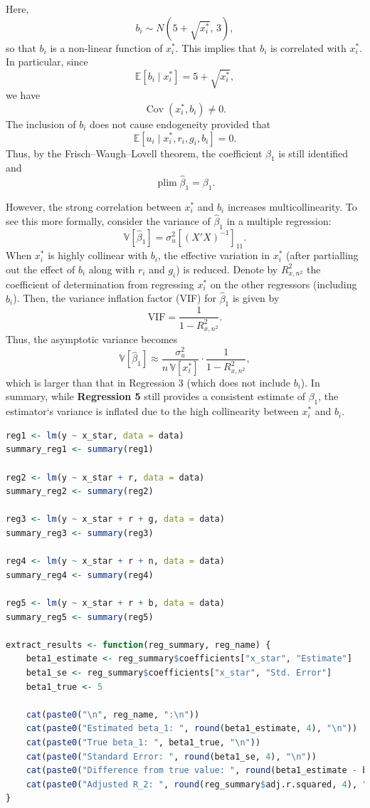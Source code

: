 \documentclass[a4paper,12pt]{article} %
\theoremstyle{nonitalic}
\newenvironment{solution}[1]
  {\renewcommand\theinnercustomsol{#1}\innercustomsol}
  {\endinnercustomsol}
\newcounter{solutionctr}
\renewcommand{\thesolutionctr}{(\alph{solutionctr})}
\newenvironment{autosolution}
  {\stepcounter{solutionctr}\begin{solution}{\thesolutionctr}}
  {\end{solution}}
\begin{document}
\begin{autosolution}
Here,
\[
b_i \sim N\left(5+\sqrt{x_i^*},\,3\right),
\]
so that $b_i$ is a non-linear function of $x_i^*$. 
This implies that $b_i$ is correlated with $x_i^*$. 
In particular, since
\[
\mathbb{E}[b_i\mid x_i^*] = 5 + \sqrt{x_i^*},
\]
we have
\[
\operatorname{Cov}(x_i^*, b_i) \neq 0.
\]
The inclusion of $b_i$ does not cause endogeneity provided that 
\[
\mathbb{E}[u_i \mid x_i^*, r_i, g_i, b_i] = 0.
\]
Thus, by the Frisch--Waugh--Lovell theorem, 
the coefficient $\beta_1$ is still identified and
\[
\operatorname*{plim}\hat{\beta}_1 = \beta_1.
\]

However, the strong correlation between $x_i^*$ and $b_i$ increases multicollinearity. 
To see this more formally, consider the variance of $\hat{\beta}_1$ in a multiple regression:
\[
\mathbb{V}[\hat{\beta}_1] = \sigma_u^2 \left[(X'X)^{-1}\right]_{11}.
\]
When $x_i^*$ is highly collinear with $b_i$, 
the effective variation in $x_i^*$ 
(after partialling out the effect of $b_i$ along with $r_i$ and $g_i$) 
is reduced. 
Denote by $R^2_{x,n^2}$ the coefficient of determination from 
regressing $x_i^*$ on the other regressors (including $b_i$). 
Then, the variance inflation factor (VIF) for $\hat{\beta}_1$ is given by
\[
\text{VIF} = \frac{1}{1-R^2_{x,n^2}}.
\]
Thus, the asymptotic variance becomes
\[
\mathbb{V}[\hat{\beta}_1] \approx \frac{\sigma_u^2}{n\,\mathbb{V}[x_i^*]}\cdot \frac{1}{1-R^2_{x,n^2}},
\]
which is larger than that in Regression 3 
(which does not include $b_i$). 
In summary, while \textbf{Regression 5} still provides a consistent estimate of $\beta_1$, 
the estimator`s variance is inflated due to the high collinearity between $x_i^*$ and $b_i$.


\begin{lstlisting}[language=R]
reg1 <- lm(y ~ x_star, data = data)
summary_reg1 <- summary(reg1)

reg2 <- lm(y ~ x_star + r, data = data)
summary_reg2 <- summary(reg2)

reg3 <- lm(y ~ x_star + r + g, data = data)
summary_reg3 <- summary(reg3)

reg4 <- lm(y ~ x_star + r + n, data = data)
summary_reg4 <- summary(reg4)

reg5 <- lm(y ~ x_star + r + b, data = data)
summary_reg5 <- summary(reg5)

extract_results <- function(reg_summary, reg_name) {
    beta1_estimate <- reg_summary$coefficients["x_star", "Estimate"]
    beta1_se <- reg_summary$coefficients["x_star", "Std. Error"]
    beta1_true <- 5
    
    cat(paste0("\n", reg_name, ":\n"))
    cat(paste0("Estimated beta_1: ", round(beta1_estimate, 4), "\n"))
    cat(paste0("True beta_1: ", beta1_true, "\n"))
    cat(paste0("Standard Error: ", round(beta1_se, 4), "\n"))
    cat(paste0("Difference from true value: ", round(beta1_estimate - beta1_true, 4), "\n"))
    cat(paste0("Adjusted R_2: ", round(reg_summary$adj.r.squared, 4), "\n"))
}


\end{lstlisting}
\end{autosolution}
\end{document}
